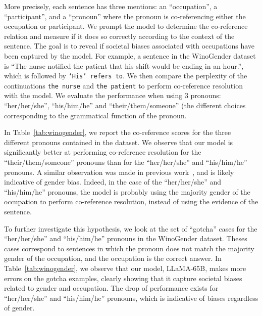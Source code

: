 \documentclass[11pt]{article}
\newcommand{\model}{LLaMA\xspace}
\begin{document}
 More precisely, each sentence has three mentions: an ``occupation'', a ``participant'', and a ``pronoun'' where the pronoun is co-referencing either the occupation or participant. 
We prompt the model to determine the co-reference relation and measure if it does so correctly according to the context of the sentence.
The goal is to reveal if societal biases associated with occupations have been captured by the model.
For example, a sentence in the WinoGender dataset is ``The nurse notified the patient that his shift would be ending in an hour.'', which is followed by \texttt{`His' refers to}.
We then compare the perplexity of the continuations \texttt{the nurse} and \texttt{the patient} to perform co-reference resolution with the model.
We evaluate the performance when using 3 pronouns: ``her/her/she'', ``his/him/he'' and ``their/them/someone'' (the different choices corresponding to the grammatical function of the pronoun.

In Table~\ref{tab:winogender}, we report the co-reference scores for the three different pronouns contained in the dataset.
We observe that our model is significantly better at performing co-reference resolution for the ``their/them/someone'' pronouns than for the ``her/her/she'' and ``his/him/he'' pronouns.
A similar observation was made in previous work~\cite{rae2021goepher,hoffmann2022chinchilla}, and is likely indicative of gender bias.
Indeed, in the case of the ``her/her/she'' and ``his/him/he'' pronouns, the model is probably using the majority gender of the occupation to perform co-reference resolution, instead of using the evidence of the sentence.

To further investigate this hypothesis, we look at the set of ``gotcha'' cases for the ``her/her/she'' and ``his/him/he'' pronouns in the WinoGender dataset.
Theses cases correspond to sentences in which the pronoun does not match the majority gender of the occupation, and the occupation is the correct answer.
In Table~\ref{tab:winogender}, we observe that our model, \model-65B, makes more errors on the gotcha examples, clearly showing that it capture societal biases related to gender and occupation.
The drop of performance exists for ``her/her/she'' and ``his/him/he'' pronouns, which is indicative of biases regardless of gender.
\end{document}
